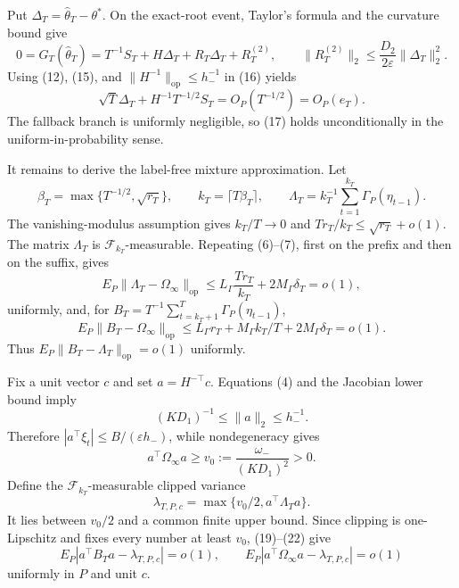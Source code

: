 Put \(\Delta_T=\widehat\theta_T-\theta^*\). On the exact-root event, Taylor's formula and the curvature bound give
\[
 0=G_T(\widehat\theta_T)
 =T^{-1}S_T+H\Delta_T+R_T\Delta_T+R_T^{(2)},
 \qquad \|R_T^{(2)}\|_2\le\frac{D_2}{2\varepsilon}\|\Delta_T\|_2^2. \tag{16}
\]
Using (12), (15), and \(\|H^{-1}\|_{\mathrm{op}}\le h_-^{-1}\) in (16) yields
\[
 \sqrt T\Delta_T+H^{-1}T^{-1/2}S_T
 =O_P(T^{-1/2})=O_P(e_T). \tag{17}
\]
The fallback branch is uniformly negligible, so (17) holds unconditionally in the uniform-in-probability sense.

It remains to derive the label-free mixture approximation. Let
\[
 \beta_T=\max\{T^{-1/2},\sqrt{r_T}\},\qquad
 k_T=\lceil T\beta_T\rceil,\qquad
 \Lambda_T=k_T^{-1}\sum_{t=1}^{k_T}\Gamma_P(\eta_{t-1}). \tag{18}
\]
The vanishing-modulus assumption gives \(k_T/T\to0\) and \(Tr_T/k_T\le\sqrt{r_T}+o(1)\). The matrix \(\Lambda_T\) is \(\mathcal F_{k_T}\)-measurable. Repeating (6)--(7), first on the prefix and then on the suffix, gives
\[
 E_P\|\Lambda_T-\Omega_\infty\|_{\mathrm{op}}
 \le L_\Gamma\frac{Tr_T}{k_T}+2M_\Gamma\delta_T=o(1), \tag{19}
\]
uniformly, and, for \(B_T=T^{-1}\sum_{t=k_T+1}^T\Gamma_P(\eta_{t-1})\),
\[
 E_P\|B_T-\Omega_\infty\|_{\mathrm{op}}
 \le L_\Gamma r_T+M_\Gamma k_T/T+2M_\Gamma\delta_T=o(1). \tag{20}
\]
Thus \(E_P\|B_T-\Lambda_T\|_{\mathrm{op}}=o(1)\) uniformly.

Fix a unit vector \(c\) and set \(a=H^{-\top}c\). Equations (4) and the Jacobian lower bound imply
\[
 (KD_1)^{-1}\le\|a\|_2\le h_-^{-1}. \tag{21}
\]
Therefore \(|a^\top\xi_t|\le B/(\varepsilon h_-)\), while nondegeneracy gives
\[
 a^\top\Omega_\infty a\ge v_0:=\frac{\omega_-}{(KD_1)^2}>0. \tag{22}
\]
Define the \(\mathcal F_{k_T}\)-measurable clipped variance
\[
 \lambda_{T,P,c}=\max\{v_0/2,a^\top\Lambda_Ta\}. \tag{23}
\]
It lies between \(v_0/2\) and a common finite upper bound. Since clipping is one-Lipschitz and fixes every number at least \(v_0\), (19)--(22) give
\[
 E_P|a^\top B_Ta-\lambda_{T,P,c}|=o(1),
 \qquad E_P|a^\top\Omega_\infty a-\lambda_{T,P,c}|=o(1) \tag{24}
\]
uniformly in \(P\) and unit \(c\).

